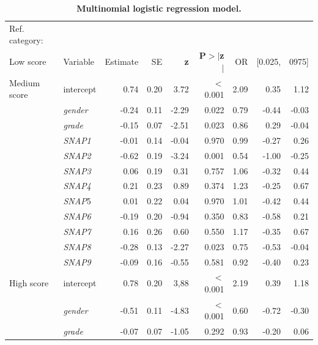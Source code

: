 \documentclass[10pt,letterpaper]{article}
\begin{document}
{{%
\begin{table}[H]
\centering
\caption{\bf Multinomial logistic regression model.} 
\begin{tabular}{|llrrrr|rrr|}
  \hline
Ref. category: &&&&&&&&\\
Low score & Variable &Estimate & SE & \textbf{z} & \textbf{P$>$$|$z$|$} &  OR &  [0.025, & 0975]\\ 
 \hline
  \hline
Medium score & intercept  & 0.74 & 0.20 & 3.72 & $<$0.001 & 2.09 &   0.35 & 1.12 \\ 
\hline
  & {\it gender} & -0.24 & 0.11 & -2.29 & 0.022 & 0.79 &  -0.44 & -0.03  \\ 
 \hline
  & {\it grade} & -0.15 & 0.07 & -2.51 & 0.023& 0.86 &  0.29 & -0.04  \\ 
 \hline
  & {\it SNAP1} & -0.01 & 0.14 & -0.04 & 0.970 & 0.99 &  -0.27 & 0.26 \\ 
  \hline
  &  {\it SNAP2} & -0.62 & 0.19 & -3.24 & 0.001 & 0.54 &  -1.00 & -0.25  \\ 
  \hline
  &  {\it SNAP3} & 0.06 & 0.19 & 0.31 & 0.757& 1.06 &  -0.32 & 0.44 \\ 
  \hline
  & {\it SNAP4} & 0.21 & 0.23 & 0.89 & 0.374 & 1.23 &  -0.25 & 0.67  \\ 
  \hline
  &  {\it SNAP}5 & 0.01 & 0.22 & 0.04 & 0.970 & 1.01 & -0.42 & 0.44 \\ 
  \hline
  &  {\it SNAP6} & -0.19 & 0.20 & -0.94 & 0.350 &  0.83 &  -0.58 & 0.21  \\ 
   \hline
  &  {\it SNAP7} & 0.16 & 0.26 & 0.60 & 0.550 & 1.17 &  -0.35 & 0.67  \\ 
  \hline
  &  {\it SNAP8} & -0.28 & 0.13 & -2.27 & 0.023 & 0.75 &  -0.53 & -0.04  \\ 
  \hline
  &  {\it SNAP9} & -0.09 & 0.16 & -0.55 & 0.581 & 0.92 &  -0.40 & 0.23  \\ 
   \hline
   \hline
   High score & intercept & 0.78 & 0.20 & 3,88 & $<$0.001 & 2.19 &  0.39 & 1.18  \\ 
  \hline
  &  {\it gender} & -0.51 & 0.11 & -4.83 & $<$0.001 & 0.60 &  -0.72 & -0.30  \\ 
 \hline
 &  {\it grade} & -0.07 & 0.07 & -1.05 & 0.292 & 0.93 &  -0.20 & 0.06  \\ 

\end{tabular}
\end{table}}}
\end{document}
